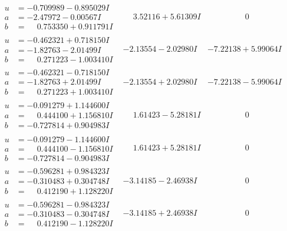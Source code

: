 \documentclass[1p]{elsarticle_modified}
\theoremstyle{definition}
\begin{document}
$$\begin{array}{c|c|c}
\begin{aligned}
u &= -0.709989 - 0.895029 I \\
a &= -2.47972 - 0.00567 I \\
b &= \phantom{-}0.753350 + 0.911791 I\end{aligned}
 & \phantom{-}3.52116 + 5.61309 I & \phantom{-0.000000 } 0 \\ \hline\begin{aligned}
u &= -0.462321 + 0.718150 I \\
a &= -1.82763 - 2.01499 I \\
b &= \phantom{-}0.271223 - 1.003410 I\end{aligned}
 & -2.13554 - 2.02980 I & -7.22138 + 5.99064 I \\ \hline\begin{aligned}
u &= -0.462321 - 0.718150 I \\
a &= -1.82763 + 2.01499 I \\
b &= \phantom{-}0.271223 + 1.003410 I\end{aligned}
 & -2.13554 + 2.02980 I & -7.22138 - 5.99064 I \\ \hline\begin{aligned}
u &= -0.091279 + 1.144600 I \\
a &= \phantom{-}0.444100 + 1.156810 I \\
b &= -0.727814 + 0.904983 I\end{aligned}
 & \phantom{-}1.61423 - 5.28181 I & \phantom{-0.000000 } 0 \\ \hline\begin{aligned}
u &= -0.091279 - 1.144600 I \\
a &= \phantom{-}0.444100 - 1.156810 I \\
b &= -0.727814 - 0.904983 I\end{aligned}
 & \phantom{-}1.61423 + 5.28181 I & \phantom{-0.000000 } 0 \\ \hline\begin{aligned}
u &= -0.596281 + 0.984323 I \\
a &= -0.310483 + 0.304748 I \\
b &= \phantom{-}0.412190 + 1.128220 I\end{aligned}
 & -3.14185 - 2.46938 I & \phantom{-0.000000 } 0 \\ \hline\begin{aligned}
u &= -0.596281 - 0.984323 I \\
a &= -0.310483 - 0.304748 I \\
b &= \phantom{-}0.412190 - 1.128220 I\end{aligned}
 & -3.14185 + 2.46938 I & \phantom{-0.000000 } 0 \\ \hline\begin{aligned}

\end{aligned}
\end{array}$$
\end{document}
